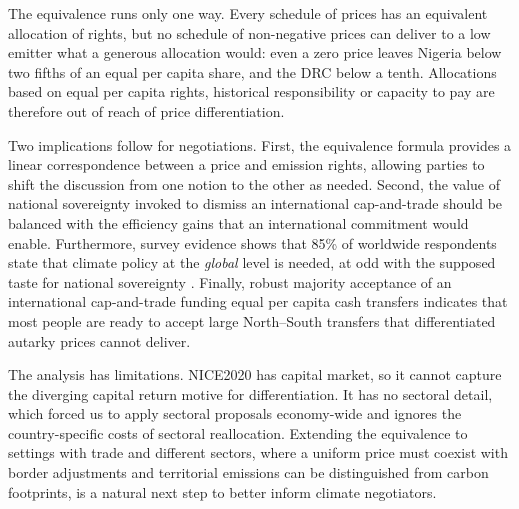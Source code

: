 \documentclass[12pt,english]{article}
\theoremstyle{remark}
\begin{document}
The equivalence runs only one way. Every schedule of prices has an equivalent allocation of rights, but no schedule of non-negative prices can deliver to a low emitter what a generous allocation would: even a zero price leaves Nigeria below two fifths of an equal per capita share, and the DRC below a tenth. %
Allocations based on equal per capita rights, historical responsibility or capacity to pay are therefore out of reach of price differentiation. %

Two implications follow for negotiations. First, the equivalence formula provides a linear correspondence between a price and emission rights, allowing parties to shift the discussion from one notion to the other as needed. %
Second, the value of national sovereignty invoked to dismiss an international cap-and-trade should be balanced with the efficiency gains that an international commitment would enable. 
Furthermore, survey evidence shows %
that 85\% of worldwide respondents state that climate policy at the \textit{global} level is needed, at odd with the supposed taste for national sovereignty \citep{fabre_majority_2025}. Finally, robust majority acceptance of an international cap-and-trade funding equal per capita cash transfers indicates that most people are ready to accept large North--South transfers that differentiated autarky prices cannot deliver.

The analysis has limitations. NICE2020 has capital market, %
so it cannot capture the diverging capital return motive %
for differentiation. 
It has no sectoral detail, which forced us to apply sectoral proposals economy-wide and ignores the country-specific costs of sectoral reallocation. %
Extending the equivalence to settings with trade and different sectors, where a uniform price must coexist with border adjustments and territorial emissions can be distinguished from carbon footprints, is a natural next step to better inform climate negotiators.
\end{document}
